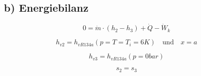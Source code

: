 \subsection*{b) Energiebilanz}

\begin{equation}
0 = \dot{m} \cdot \left( h_{2} - h_{3} \right) + \dot{Q} - \dot{W}_{k}
\end{equation}

\begin{equation}
h_{v2} = h_{vR134a} \left( p = T = T_{i} = 6K \right) \quad \text{und} \quad x = a
\end{equation}

\begin{equation}
h_{v3} = h_{vR134a} \left( p = 0bar \right)
\end{equation}

\begin{equation}
s_{2} = s_{3}
\end{equation}